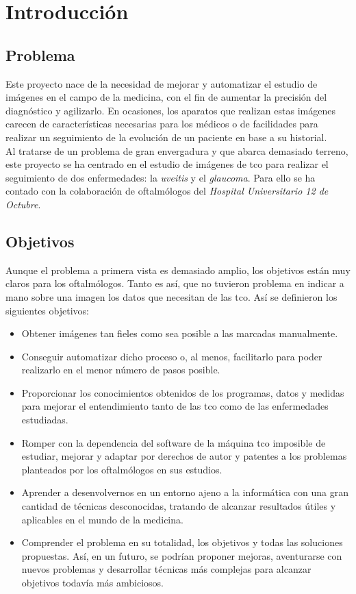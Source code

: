 \chapter{Introducción}
\section{Problema}
Este proyecto nace de la necesidad de mejorar y automatizar el estudio 
de imágenes en el campo de la medicina, con el fin de aumentar la precisión 
del diagnóstico y agilizarlo. En ocasiones, los aparatos que realizan 
estas imágenes carecen de características necesarias para los médicos 
o de facilidades para realizar un seguimiento de la evolución de un paciente 
en base a su historial. \\
Al tratarse de un problema de gran envergadura y que abarca demasiado
terreno, este proyecto se ha centrado en el estudio de imágenes de \gls{tco}
para realizar el seguimiento de dos enfermedades: la \emph{uveitis} y
el \emph{glaucoma}. Para ello se ha contado con la colaboración de
oftalmólogos del \emph{Hospital Universitario 12 de Octubre}.

\section{Objetivos}
Aunque el problema a primera vista es demasiado amplio,
los objetivos están muy claros para los oftalmólogos. Tanto es así, 
que no tuvieron problema en indicar a mano sobre una imagen los datos que 
necesitan de las \gls{tco}. Así se definieron los siguientes objetivos:
\begin{itemize}
\item Obtener imágenes tan fieles como sea posible a las marcadas
  manualmente.
\item Conseguir automatizar dicho proceso o, al menos,
  facilitarlo para poder realizarlo en el menor número de pasos posible.
\item Proporcionar los conocimientos obtenidos de los programas, datos y
  medidas para mejorar el entendimiento tanto de las \gls{tco}
  como de las enfermedades estudiadas.
\item Romper con la dependencia del software de la máquina \gls{tco}
  imposible de estudiar, mejorar y adaptar por derechos de autor y
  patentes a los problemas planteados por los oftalmólogos en sus
  estudios.
\item Aprender a desenvolvernos en un entorno ajeno a la informática
  con una gran cantidad de técnicas desconocidas, tratando de alcanzar
  resultados útiles y aplicables en el mundo de la medicina.
\item Comprender el problema en su totalidad, los objetivos y todas
  las soluciones propuestas. Así, en un futuro, se podrían proponer
  mejoras, aventurarse con nuevos problemas y desarrollar técnicas más
  complejas para alcanzar objetivos todavía más ambiciosos.
\end{itemize}
